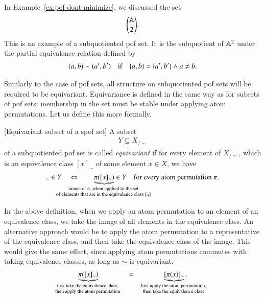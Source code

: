 \begin{myexample}\label{ex:atoms-choose-two}
    In Example~\ref{ex:pof-dont-minimize}, we discussed the set 
    \begin{align*}
    {\mathbb A\choose 2}.
    \end{align*}
    This is an example of a subquotiented pof set. It is the subquotient of $\mathbb A^2$ under the partial equivalence relation defined by 
    \begin{align*}
    (a,b) \sim (a',b') \quad \text{if} \quad \{a,b\} = \{a',b'\} \land a \neq b.
    \end{align*}
\end{myexample}

Similarly to the case of pof sets, all structure on subquotiented pof sets will be required to be equivariant. Equivariance is defined in the same way as for subsets of pof sets: membership in the set must be stable under applying atom permutations. Let us define this more formally.

\begin{definition}\label{def:equivariant-subset-of-a-spof}[Equivariant subset of a spof set]
    A subset 
    \begin{align*}
    Y \subseteq X_{/\sim}
    \end{align*}
    of a subquotiented pof set is called \emph{equivariant} if for every element of $X_{/\sim}$, which is an equivalence class $[x]_\sim$ of some element $x \in X$, we have 
    \begin{align*}
    [x]_\sim \in Y \quad \Leftrightarrow \qquad \myunderbrace{\pi([x]_\sim)}{image of $\pi$, when applied to  the set \\ of elements that are in the equivalence class $[x]$} \in Y \quad \text{for every atom permutation $\pi$}.
    \end{align*}
\end{definition}

In the above definition, when we apply an atom permutation to an element of an equivalence class, we take the image of all elements in the equivalence class. An alternative approach would be to apply the atom permutation to a representative of the equivalence class, and then take the equivalence class of the image. This would give the same effect, since applying atom permutations commutes with taking equivalence classes, as long as $\sim$ is equivariant:
    \begin{align*}
    \myunderbrace{\pi([x]_\sim)}{first take the equivalence class, \\ then apply the atom permutation}
    \qquad \qquad  = \qquad \qquad
    \myunderbrace{[\pi(x)]_\sim}{first apply the atom permutation, \\ then take the equivalence class}.
    \end{align*}


